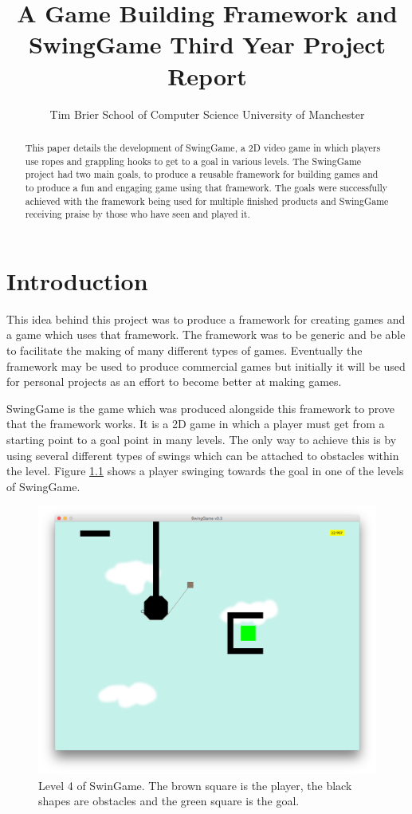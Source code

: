 \documentclass[]{report}
\title{
	A Game Building Framework and SwingGame\endgraf
	Third Year Project Report
}
\author{
	\parbox{\linewidth}{
		\centering%
		Tim Brier\endgraf
		School of Computer Science\endgraf
		University of Manchester
	}
}
\date{
	\parbox{\linewidth}{
		\centering%
		April 2015\endgraf\bigskip
		Supervised by Dr Steve Pettifer
	}
}
\begin{document}
\maketitle

\begin{abstract}
This paper details the development of SwingGame, a 2D video game in which players use ropes and grappling hooks to get to a goal in various levels.  The SwingGame project had two main goals, to produce a reusable framework for building games and to produce a fun and engaging game using that framework. The goals were successfully achieved with the framework being used for multiple finished products and SwingGame receiving praise by those who have seen and played it.
\end{abstract}

\tableofcontents

\chapter{Introduction}
This idea behind this project was to produce a framework for creating games and a game which uses that framework. The framework was to be generic and be able to facilitate the making of many different types of games. Eventually the framework may be used to produce commercial games but initially it will be used for personal projects as an effort to become better at making games.

SwingGame is the game which was produced alongside this framework to prove that the framework works. It is a 2D game in which a player must get from a starting point to a goal point in many levels. The only way to achieve this is by using several different types of swings which can be attached to obstacles within the level. Figure \ref{sgexample} shows a player swinging towards the goal in one of the levels of SwingGame.

\begin{figure}[H]
	\centering
	\includegraphics[scale=0.25]{sgexample}
	\caption{Level 4 of SwinGame. The brown square is the player, the black shapes are obstacles and the green square is the goal.}
	\label{sgexample}
\end{figure}
\end{document}
